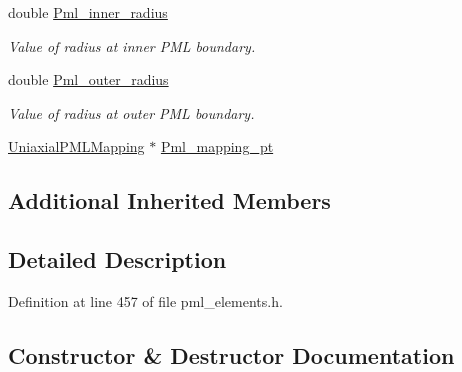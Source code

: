 \begin{DoxyCompactItemize}
double \hyperlink{classoomph_1_1AnnularFromLocalCoordinatePMLElement_a90aa4d2d40c250c35e0bfbac50c9a9d1}{Pml\+\_\+inner\+\_\+radius}
\begin{DoxyCompactList}\small\item\em Value of radius at inner P\+ML boundary. \end{DoxyCompactList}\item 
double \hyperlink{classoomph_1_1AnnularFromLocalCoordinatePMLElement_a360bd3ab9afbcfd1007a626b780d51d8}{Pml\+\_\+outer\+\_\+radius}
\begin{DoxyCompactList}\small\item\em Value of radius at outer P\+ML boundary. \end{DoxyCompactList}\item 
\hyperlink{classoomph_1_1UniaxialPMLMapping}{Uniaxial\+P\+M\+L\+Mapping} $\ast$ \hyperlink{classoomph_1_1AnnularFromLocalCoordinatePMLElement_a51049d96dbdb41fc740bdabd5657b99b}{Pml\+\_\+mapping\+\_\+pt}
\end{DoxyCompactItemize}
\subsection*{Additional Inherited Members}


\subsection{Detailed Description}


Definition at line 457 of file pml\+\_\+elements.\+h.



\subsection{Constructor \& Destructor Documentation}
\mbox{\label{classoomph_1_1AnnularFromLocalCoordinatePMLElement_a3e7cb53dd208524cb5378d1ec2ee1e89}} 
